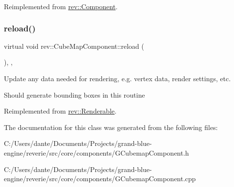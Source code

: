Reimplemented from \mbox{\hyperlink{classrev_1_1_component_ae2827b14c278588b95e01c4743fae674}{rev\+::\+Component}}.

\mbox{\label{classrev_1_1_cube_map_component_ace8f36c985acb2621b2c11b8c05b514e}} 
\subsubsection{\texorpdfstring{reload()}{reload()}}
{\footnotesize\ttfamily virtual void rev\+::\+Cube\+Map\+Component\+::reload (\begin{DoxyParamCaption}{ }\end{DoxyParamCaption})\hspace{0.3cm}{\ttfamily [inline]}, {\ttfamily [override]}, {\ttfamily [virtual]}}



Update any data needed for rendering, e.\+g. vertex data, render settings, etc. 

Should generate bounding boxes in this routine 

Reimplemented from \mbox{\hyperlink{classrev_1_1_renderable_a5acb035c13043156c23602406f1c8819}{rev\+::\+Renderable}}.



The documentation for this class was generated from the following files\+:\begin{DoxyCompactItemize}
\item 
C\+:/\+Users/dante/\+Documents/\+Projects/grand-\/blue-\/engine/reverie/src/core/components/G\+Cubemap\+Component.\+h\item 
C\+:/\+Users/dante/\+Documents/\+Projects/grand-\/blue-\/engine/reverie/src/core/components/G\+Cubemap\+Component.\+cpp\end{DoxyCompactItemize}
